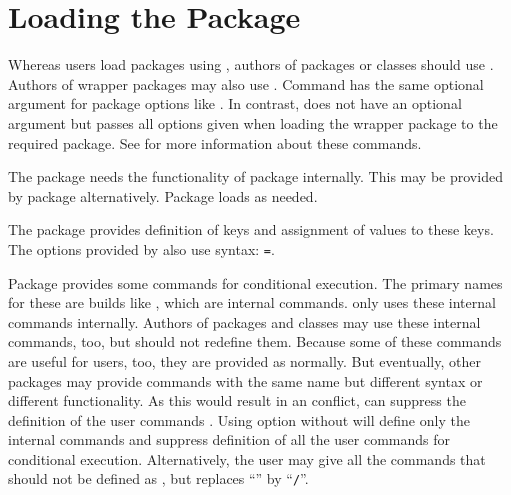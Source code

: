 \section{Loading the Package}
\label{sec:scrbase.loadit}

Whereas users load packages using , authors of packages or
classes should use . Authors of
wrapper packages may also use . Command
 has the same optional argument for package options like
. In contrast,  does not
have an optional argument but passes all options given when loading the
wrapper package to the required package. See \cite{latex:clsguide} for more
information about these commands.

The package  needs the functionality of package
 internally. This may be provided by
package  alternatively. Package  loads
 as needed.

The package  provides definition of keys and assignment of
values to these keys. The options provided by  also use
 syntax: \texttt{=}.

\begin{Declaration}
\end{Declaration}
%
Package  provides some commands for conditional
execution. The primary names for these are builds like
, which are internal commands. \KOMAScript{} only uses
these internal commands internally. Authors of packages and classes may use
these internal commands, too, but should not redefine them. Because some of
these commands are useful for users, too, they are provided as
 normally. But eventually, other packages may provide
commands with the same name but different syntax or different
functionality. As this would result in an conflict,  can
suppress the definition of the user commands . Using
option  without  will define only the
internal commands and suppress definition of all the user commands for
conditional execution. Alternatively, the user may give all the commands that
should not be defined as , but replaces ``\Macro{}'' by
``\texttt{/}''.

